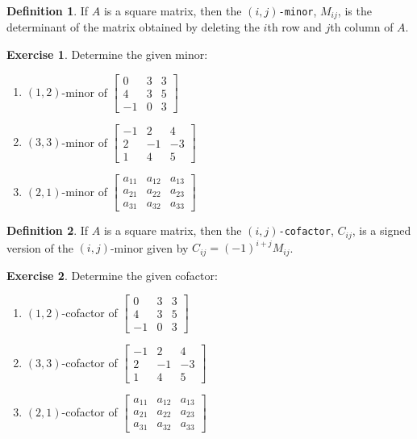\documentclass[handout]{beamer}
\newcommand{\fn}{\insertframenumber}
\theoremstyle{definition}
\newtheorem{exercise}{Exercise}
\newtheorem*{defn}{Definition}
\renewcommand{\emph}[1]{{\color{blue}\texttt{#1}}}
\begin{document}
\begin{frame}{\fn}
	\begin{defn}
		If $A$ is a square matrix, then the \emph{$(i,j)$-minor}, $M_{ij}$, is the determinant of the matrix obtained by deleting the $i$th row and $j$th column of $A$.
	\end{defn}
	\begin{exercise}
		Determine the given minor:
		\begin{enumerate}[label=(\alph*)]
			\item $(1,2)$-minor of $\begin{bmatrix}
			0 & 3 & 3 \\
			4 & 3 & 5 \\
			-1 & 0 & 3
			\end{bmatrix}$
			\item $(3,3)$-minor of $\begin{bmatrix}
			-1 & 2 & 4 \\
			2 & -1 & -3 \\
			1 & 4 & 5
			\end{bmatrix}$
			\item $(2,1)$-minor of $\begin{bmatrix}
			a_{11}&a_{12}&a_{13}\\
			a_{21}&a_{22}&a_{23}\\
			a_{31}&a_{32}&a_{33}
			\end{bmatrix}$
		\end{enumerate}
	\end{exercise}
\end{frame}
\begin{frame}{\fn}
\begin{defn}
	If $A$ is a square matrix, then the \emph{$(i,j)$-cofactor}, $C_{ij}$, is a signed version of the $(i,j)$-minor given by $C_{ij}=(-1)^{i+j}M_{ij}$.
\end{defn}
\begin{exercise}
	Determine the given cofactor:
	\begin{enumerate}[label=(\alph*)]
		\item $(1,2)$-cofactor of $\begin{bmatrix}
		0 & 3 & 3 \\
		4 & 3 & 5 \\
		-1 & 0 & 3
		\end{bmatrix}$
		\item $(3,3)$-cofactor of $\begin{bmatrix}
		-1 & 2 & 4 \\
		2 & -1 & -3 \\
		1 & 4 & 5
		\end{bmatrix}$
		\item $(2,1)$-cofactor of $\begin{bmatrix}
		a_{11}&a_{12}&a_{13}\\
		a_{21}&a_{22}&a_{23}\\
		a_{31}&a_{32}&a_{33}
		\end{bmatrix}$
	\end{enumerate}
\end{exercise}
\end{frame}
\end{document}
